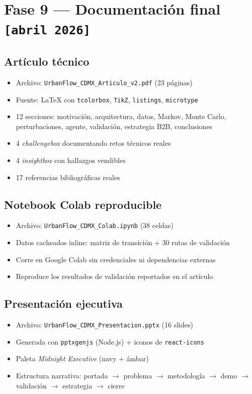 \documentclass[11pt,a4paper]{article}
\begin{document}
\section{Fase 9 --- Documentación final \texttt{[abril 2026]}}

\subsection{Artículo técnico}
\begin{itemize}
  \item Archivo: \texttt{UrbanFlow\_CDMX\_Articulo\_v2.pdf} (23 páginas)
  \item Fuente: \LaTeX{} con \texttt{tcolorbox}, \texttt{TikZ}, \texttt{listings}, \texttt{microtype}
  \item 12 secciones: motivación, arquitectura, datos, Markov, Monte Carlo, perturbaciones, agente, validación, estrategia B2B, conclusiones
  \item 4 \textit{challengebox} documentando retos técnicos reales
  \item 4 \textit{insightbox} con hallazgos vendibles
  \item 17 referencias bibliográficas reales
\end{itemize}

\subsection{Notebook Colab reproducible}
\begin{itemize}
  \item Archivo: \texttt{UrbanFlow\_CDMX\_Colab.ipynb} (38 celdas)
  \item Datos cacheados inline: matriz de transición + 30 rutas de validación
  \item Corre en Google Colab sin credenciales ni dependencias externas
  \item Reproduce los resultados de validación reportados en el artículo
\end{itemize}

\subsection{Presentación ejecutiva}
\begin{itemize}
  \item Archivo: \texttt{UrbanFlow\_CDMX\_Presentacion.pptx} (16 slides)
  \item Generada con \texttt{pptxgenjs} (Node.js) + iconos de \texttt{react-icons}
  \item Paleta \textit{Midnight Executive} (navy + ámbar)
  \item Estructura narrativa: portada $\rightarrow$ problema $\rightarrow$ metodología $\rightarrow$ demo $\rightarrow$ validación $\rightarrow$ estrategia $\rightarrow$ cierre
\end{itemize}
\end{document}
